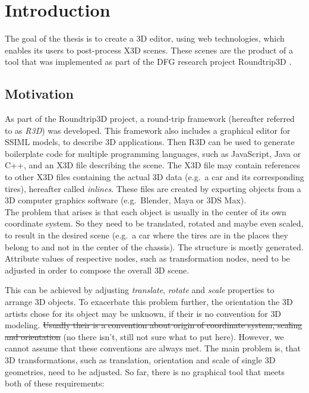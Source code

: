 
\section{Introduction}
\label{sec:Prelude}

The goal of the thesis is to create a \gls{3D} editor, using web technologies,
which enables its users to post-process \gls{X3D} scenes. These scenes are the
product of a tool that was implemented as part of the DFG research
project \gls{Roundtrip3D} \cite{Jung:2015:SDA:2802768.2802837}.
\subsection{Motivation}\label{motivation}

As part of the Roundtrip3D project, a round-trip framework (hereafter
referred to as \emph{R3D}) was developed. This framework also includes a
graphical editor for SSIML models, to describe \gls{3D} applications. Then
\gls{R3D} can be used to generate boilerplate code for multiple programming
languages, such as JavaScript, Java or C++, and an \gls{X3D} file describing
the scene. The \gls{X3D} file may contain references to other \gls{X3D} files
containing the actual \gls{3D} data (e.g.~a car and its corresponding tires),
hereafter called \emph{inlines}. These files are created by exporting
objects from a \gls{3D} computer graphics software (e.g.~Blender,
Maya or 3DS Max).\\
The problem that arises is that each object is usually in the center of
its own coordinate system. So they need to be translated, rotated and
maybe even scaled, to result in the desired scene (e.g.~a car where the tires
are in the places they belong to and not in the center of the chassis).
The structure is mostly generated. Attribute values of respective nodes,
such as transformation nodes, need to be adjusted in order to compose the
overall \gls{3D} scene.


This can be achieved by adjusting \emph{translate}, \emph{rotate} and
\emph{scale} properties to arrange \gls{3D} objects. To exacerbate this problem
further, the orientation the \gls{3D} artists chose for its object may be unknown, if
their is no convention for \gls{3D} modeling. \sout{Usually their is a convention
about origin of coordinate system, scaling and orientation} (no there isn't, still
not sure what to put here). However, we cannot assume that these conventions are
always met. The main problem is, that \gls{3D} transformations, such as translation,
orientation and scale of single \gls{3D} geometries, need to be adjusted. So far,
there is no graphical tool that meets both of these requirements:

